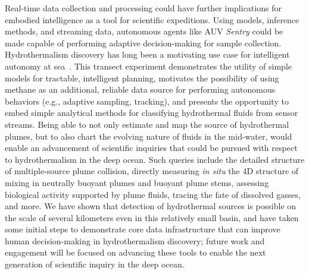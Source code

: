 Real-time data collection and processing could have further implications for embodied intelligence as a tool for scientific expeditions. Using models, inference methods, and streaming data, autonomous agents like AUV \emph{Sentry} could be made capable of performing adaptive decision-making for sample collection. Hydrothermalism discovery has long been a motivating use case for intelligent autonomy at sea~\autocite{yoerger2007autonomous, jakuba2007stochastic, branch2020demonstration, wang20203}. This transect experiment demonstrates the utility of simple models for tractable, intelligent planning, motivates the possibility of using methane as an additional, reliable data source for performing autonomous behaviors (e.g., adaptive sampling, tracking), and presents the opportunity to embed simple analytical methods for classifying hydrothermal fluids from sensor streams. Being able to not only estimate and map the source of hydrothermal plumes, but to also chart the evolving nature of fluids in the mid-water, would enable an advancement of scientific inquiries that could be pursued with respect to hydrothermalism in the deep ocean. Such queries include the detailed structure of multiple-source plume collision, directly measuring \emph{in situ} the 4D structure of mixing in neutrally buoyant plumes and buoyant plume stems, assessing biological activity supported by plume fluids, tracing the fate of dissolved gasses, and more. We have shown that detection of hydrothermal sources is possible on the scale of several kilometers even in this relatively small basin, and have taken some initial steps to demonstrate core data infrastructure that can improve human decision-making in hydrothermalism discovery; future work and engagement will be focused on advancing these tools to enable the next generation of scientific inquiry in the deep ocean.
